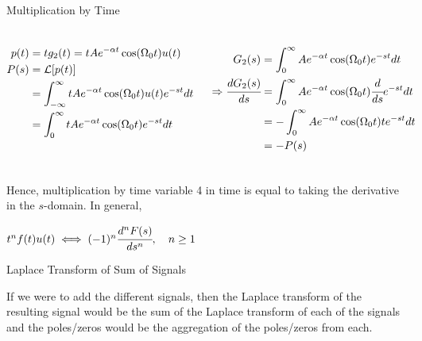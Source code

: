 \documentclass[aspectratio=169,xcolor=dvipsnames,svgnames,x11names,fleqn]{beamer}
\begin{document}
\begin{frame}{}
\vspace*{-9\baselineskip}
    \color{LightGray}{Blank space for calculation}
\end{frame}

\begin{frame}{Multiplication by Time}


\begin{columns}
    \begin{equation*}
        \begin{aligned}
            p(t) & = t g_2(t) = tAe^{-\alpha t }\cos(\Omega_0t)u(t)\\
            P(s) & = {\mathcal L}[ p(t)]\\
            & = \int_{-\infty}^\infty  tAe^{-\alpha t }\cos(\Omega_0t)u(t) e^{-st}dt\\
            & = \int_{0}^\infty  tAe^{-\alpha t }\cos(\Omega_0t) e^{-st}dt
        \end{aligned}
    \end{equation*}



    \begin{equation*}
        \begin{aligned}
            G_2(s) & =  \int_{0}^\infty  Ae^{-\alpha t }\cos(\Omega_0t) e^{-st}dt\\
            \Rightarrow \cfrac{dG_2(s)}{ds}& =   \int_{0}^\infty  Ae^{-\alpha t }\cos(\Omega_0t) \cfrac{d}{ds}e^{-st}dt
            \\
            & = - \int_{0}^\infty  Ae^{-\alpha t }\cos(\Omega_0t)te^{-st}dt\\
            & = -P(s)
        \end{aligned}
    \end{equation*}
\end{columns}
Hence, multiplication by time variable 4 in time is equal to taking the derivative in the $s$-domain. In general, 

  
    $
        t^n f(t) u(t) \iff (-1)^n \cfrac{d^n F(s)}{ds^n}, \quad n \geq 1
    $

    
\end{frame}

\begin{frame}{Laplace Transform of Sum of Signals}

    \begin{center}
        If we were to add the different signals, then the Laplace transform of the resulting signal would be the sum of the Laplace transform of each of the signals and the poles/zeros would be the aggregation of the poles/zeros from each.
    \end{center}
\end{frame}
\end{document}
